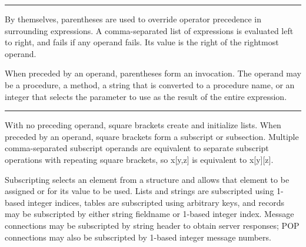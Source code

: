 \bigskip\hrule\vspace{0.1cm}


\noindent
By themselves, parentheses are used
to override operator precedence in surrounding expressions. A
comma-separated list of expressions is evaluated left to right, and
fails if any operand fails. Its value is the right of the rightmost
operand.

When preceded by an operand, parentheses form an invocation. The operand may be a procedure, a method, a
string that is converted to a procedure name, or an integer that
selects the parameter to use as the result of the entire expression.

\bigskip\hrule\vspace{0.1cm}







\noindent
With no preceding operand, square brackets create and initialize lists.
When preceded by an operand, square brackets form a subscript or
subsection. Multiple comma-separated subscript operands are equivalent
to separate subscript operations with repeating square brackets, so
\textsf{x[y,z]} is equivalent to \textsf{x[y][z]}.

Subscripting selects an element from a structure and allows that element
to be assigned or for its value to be used. Lists and strings are
subscripted using 1-based integer indices, tables are subscripted using
arbitrary keys, and records may be subscripted by either string
fieldname or 1-based integer index. Message connections may be
subscripted by string header to obtain server responses; POP
connections may also be subscripted by 1-based integer message numbers.

